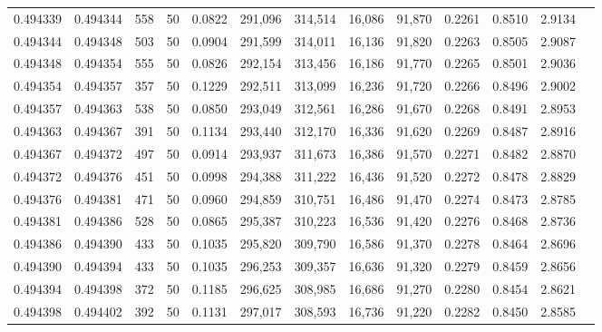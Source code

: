 \begin{tabular}{rrrrrrrrrrrrr}
0.494339 & 0.494344 &   558 &  50 &                                     0.0822 & 291,096 & 314,514 &  16,086 &  91,870 & 0.2261 & 0.8510 & 2.9134 \\
0.494344 & 0.494348 &   503 &  50 &                                     0.0904 & 291,599 & 314,011 &  16,136 &  91,820 & 0.2263 & 0.8505 & 2.9087 \\
0.494348 & 0.494354 &   555 &  50 &                                     0.0826 & 292,154 & 313,456 &  16,186 &  91,770 & 0.2265 & 0.8501 & 2.9036 \\
0.494354 & 0.494357 &   357 &  50 &                                     0.1229 & 292,511 & 313,099 &  16,236 &  91,720 & 0.2266 & 0.8496 & 2.9002 \\
0.494357 & 0.494363 &   538 &  50 &                                     0.0850 & 293,049 & 312,561 &  16,286 &  91,670 & 0.2268 & 0.8491 & 2.8953 \\
0.494363 & 0.494367 &   391 &  50 &                                     0.1134 & 293,440 & 312,170 &  16,336 &  91,620 & 0.2269 & 0.8487 & 2.8916 \\
0.494367 & 0.494372 &   497 &  50 &                                     0.0914 & 293,937 & 311,673 &  16,386 &  91,570 & 0.2271 & 0.8482 & 2.8870 \\
0.494372 & 0.494376 &   451 &  50 &                                     0.0998 & 294,388 & 311,222 &  16,436 &  91,520 & 0.2272 & 0.8478 & 2.8829 \\
0.494376 & 0.494381 &   471 &  50 &                                     0.0960 & 294,859 & 310,751 &  16,486 &  91,470 & 0.2274 & 0.8473 & 2.8785 \\
0.494381 & 0.494386 &   528 &  50 &                                     0.0865 & 295,387 & 310,223 &  16,536 &  91,420 & 0.2276 & 0.8468 & 2.8736 \\
0.494386 & 0.494390 &   433 &  50 &                                     0.1035 & 295,820 & 309,790 &  16,586 &  91,370 & 0.2278 & 0.8464 & 2.8696 \\
0.494390 & 0.494394 &   433 &  50 &                                     0.1035 & 296,253 & 309,357 &  16,636 &  91,320 & 0.2279 & 0.8459 & 2.8656 \\
0.494394 & 0.494398 &   372 &  50 &                                     0.1185 & 296,625 & 308,985 &  16,686 &  91,270 & 0.2280 & 0.8454 & 2.8621 \\
0.494398 & 0.494402 &   392 &  50 &                                     0.1131 & 297,017 & 308,593 &  16,736 &  91,220 & 0.2282 & 0.8450 & 2.8585 \\

\end{tabular}
